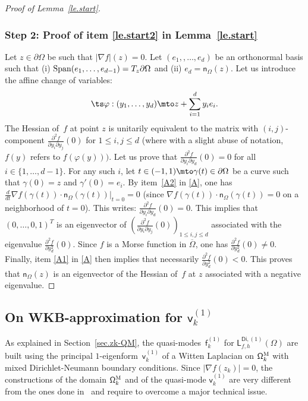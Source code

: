 \begin{proof}[Proof of Lemma~\ref{le.start}]
\subsubsection*{Step 2: Proof of item \eqref{le.start2} in Lemma~\ref{le.start}}
Let $z\in \partial \Omega$ be such that $\vert \nabla f\vert (z)=0$.
Let $(e_1,, \ldots,e_d)$ be an orthonormal basis such that (i) $ {\rm
Span}(e_1, \ldots, e_{d-1}) = T_z \partial \Omega$ and (ii) $e_d = \mathsf n_\Omega(z)$.
Let us introduce the affine change of variables:
\[\ts
\varphi: (y_1,\ldots,y_d) \mto z + \sum_{i=1}^d y_i e_i.
\]
The Hessian of~$f$ at point $z$
is unitarily equivalent to the matrix with $(i,j)$-component
$\frac{\partial^2 f}{\partial y_i \partial y_j}(0)$ for $1 \le i,j
\le d$ (where with a slight abuse of notation, $f(y)$ refers to $f
(\varphi(y)))$. Let us prove that
$\frac{\partial^2 f}{\partial y_i
\partial y_d}(0)=0$ for all $i \in \{1, \ldots, d-1\}$. For any such $i$,
let $t \in (-1,1) \mto \gamma(t) \in \partial \Omega$ be a
curve such that $\gamma(0)=z$ and $\gamma'(0)=e_i$. By item~\eqref{A2} in \ref{A}, one has
$\frac{d}{dt} \nabla f(\gamma(t)) \cdot \mathsf n_{\Omega}(\gamma(t)) \big|_{t=0} = 0$ (since $\nabla f(\gamma(t)) \cdot
\mathsf n_{\Omega}(\gamma(t))=0$ on a neighborhood of $t=0$). This writes:
$\frac{\partial^2 f}{\partial y_i \partial y_d}(0)=0$. This implies that
$(0,\ldots,0,1)^T$ is an eigenvector of $\left(\frac{\partial^2
f}{\partial y_i \partial y_j}(0)\right)_{1 \le i,j \le d}$ associated
with the eigenvalue $\frac{\partial^2 f}{\partial y_d^2}(0)$. Since $f$
is a Morse function in $\overline{\Omega}$, one has $\frac{\partial^2
f}{\partial y_d^2}(0)\neq 0$. Finally, item \eqref{A1} in \ref{A} then
implies that necessarily $\frac{\partial^2 f}{\partial y_d^2}(0) < 0$.
This proves that $\mathsf n_\Omega(z)$ is an eigenvector of the Hessian of~$f$ at $z$ associated with a negative eigenvalue. \end{proof}

\subsection{On WKB-approximation for $ \mathsf v_k^{(1)}$}\label{sec:WKB}

As explained in Section~\ref{sec.zk-QM}, the quasi-modes~$\mathsf f_k^{(1)}$
for $\mathsf L_{f,h}^{\mathsf{Di},(1)}(\Omega)$ are built using the
principal $1$-eigenform~$ \mathsf v_k^{(1)} $ of a Witten Laplacian on $\mathsf \Omega_k^{\textsc{M}}$ with
mixed Dirichlet-Neumann boundary conditions. Since $\vert \nabla f(z_k)\vert =0$, the constructions of the domain $\mathsf \Omega_k^{\textsc{M}}$ and of the quasi-mode $\mathsf v_k^{(1)} $ are very different from the ones done in~\cite{DLLN} and require to overcome a major technical issue.


